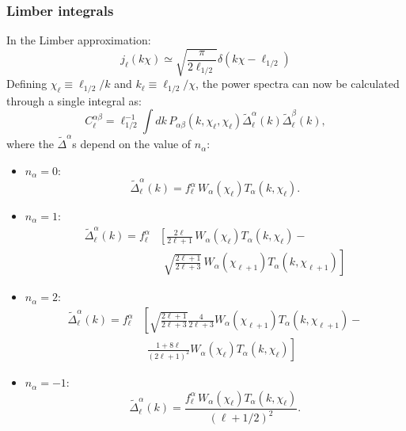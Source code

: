 \documentclass[\docopts]{\docclass}
\begin{document}
\subsubsection*{Limber integrals}
In the Limber approximation:
\begin{equation}
j_\ell(k\chi)\simeq\sqrt{\frac{\pi}{2\ell_{1/2}}} \delta(k\chi-\ell_{1/2})
\end{equation}
Defining $\chi_\ell\equiv \ell_{1/2}/k$ and $k_\ell\equiv\ell_{1/2}/\chi$, the power
spectra can now be calculated through a single integral as:
\begin{equation}
C^{\alpha\beta}_\ell=\ell_{1/2}^{-1}\int dk\,P_{\alpha\beta}(k,\chi_\ell,\chi_\ell)
\tilde{\Delta}^\alpha_\ell(k)\tilde{\Delta}^\beta_\ell(k),
\end{equation}
where the $\tilde{\Delta}^\alpha$s depend on the value of $n_\alpha$:
\begin{itemize}
\item $n_\alpha=0$:
\begin{equation}
  \tilde{\Delta}^\alpha_\ell(k)=f^\alpha_\ell\,W_\alpha(\chi_\ell)T_\alpha(k,\chi_\ell).
\end{equation}
\item $n_\alpha=1$:
\begin{align}\nonumber
 \tilde{\Delta}^\alpha_\ell(k)=f^\alpha_\ell&\left[\frac{2\ell}{2\ell+1}\,W_\alpha(\chi_\ell)T_\alpha(k,\chi_\ell)-\right.\\
 &\hspace{5pt}\left.\sqrt{\frac{2\ell+1}{2\ell+3}}\,W_\alpha(\chi_{\ell+1})T_\alpha(k,\chi_{\ell+1})\right]
\end{align}
\item $n_\alpha=2$:
\begin{align}\nonumber
 \tilde{\Delta}^\alpha_\ell(k)=f^\alpha_\ell&\left[\sqrt{\frac{2\ell+1}{2\ell+3}}\frac{4}{2\ell+3}W_\alpha(\chi_{\ell+1})T_\alpha(k,\chi_{\ell+1})-\right.\\
 &\hspace{5pt}\left.\frac{1+8\ell}{(2\ell+1)^2}W_\alpha(\chi_\ell)T_\alpha(k,\chi_\ell)\right]
\end{align}
\item $n_\alpha=-1$:
\begin{equation}
  \tilde{\Delta}^\alpha_\ell(k)=\frac{f^\alpha_\ell\,W_\alpha(\chi_\ell)T_\alpha(k,\chi_\ell)}{(\ell+1/2)^2}.
\end{equation}
\end{itemize}
\end{document}
